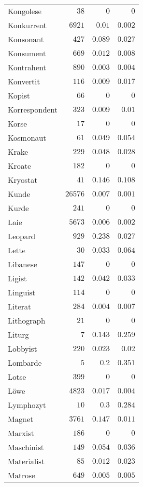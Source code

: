 \begin{supertabular}{lrrr}
Kongolese & $38$ & $0$ & $0$ \\
Konkurrent & $6921$ & $0.01$ & $0.002$ \\
Konsonant & $427$ & $0.089$ & $0.027$ \\
Konsument & $669$ & $0.012$ & $0.008$ \\
Kontrahent & $890$ & $0.003$ & $0.004$ \\
Konvertit & $116$ & $0.009$ & $0.017$ \\
Kopist & $66$ & $0$ & $0$ \\
Korrespondent & $323$ & $0.009$ & $0.01$ \\
Korse & $17$ & $0$ & $0$ \\
Kosmonaut & $61$ & $0.049$ & $0.054$ \\
Krake & $229$ & $0.048$ & $0.028$ \\
Kroate & $182$ & $0$ & $0$ \\
Kryostat & $41$ & $0.146$ & $0.108$ \\
Kunde & $26576$ & $0.007$ & $0.001$ \\
Kurde & $241$ & $0$ & $0$ \\
Laie & $5673$ & $0.006$ & $0.002$ \\
Leopard & $929$ & $0.238$ & $0.027$ \\
Lette & $30$ & $0.033$ & $0.064$ \\
Libanese & $147$ & $0$ & $0$ \\
Ligist & $142$ & $0.042$ & $0.033$ \\
Linguist & $114$ & $0$ & $0$ \\
Literat & $284$ & $0.004$ & $0.007$ \\
Lithograph & $21$ & $0$ & $0$ \\
Liturg & $7$ & $0.143$ & $0.259$ \\
Lobbyist & $220$ & $0.023$ & $0.02$ \\
Lombarde & $5$ & $0.2$ & $0.351$ \\
Lotse & $399$ & $0$ & $0$ \\
Löwe & $4823$ & $0.017$ & $0.004$ \\
Lymphozyt & $10$ & $0.3$ & $0.284$ \\
Magnet & $3761$ & $0.147$ & $0.011$ \\
Marxist & $186$ & $0$ & $0$ \\
Maschinist & $149$ & $0.054$ & $0.036$ \\
Materialist & $85$ & $0.012$ & $0.023$ \\
Matrose & $649$ & $0.005$ & $0.005$ \\

\end{supertabular}
